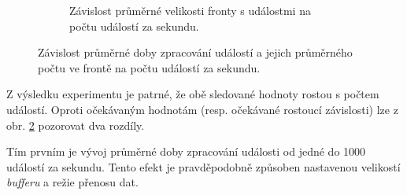 \begin{figure}[h]
\begin{subfigure}[t!]{0.47\textwidth}
        \caption{Závislost průměrné velikosti fronty s událostmi na počtu událostí za sekundu.}
        \label{fig:test:exp1:zavyslost_na_poctu_udalosti:velikost_fronty}
        
    \end{subfigure}
        
    \caption{Závislost průměrné doby zpracování událostí a jejich průměrného počtu ve frontě na počtu událostí za sekundu.}
    \label{fig:test:exp1:zavyslost_na_poctu_udalosti}
\end{figure}

Z výsledku experimentu je patrné, že obě sledované hodnoty rostou s počtem událostí. Oproti očekávaným hodnotám (resp. očekávané rostoucí závislosti) lze z obr. \ref{fig:test:exp1:zavyslost_na_poctu_udalosti} pozorovat dva rozdíly. 

Tím prvním je vývoj průměrné doby zpracování události od jedné do 1000 událostí za sekundu. Tento efekt je pravděpodobně způsoben nastavenou velikostí \textit{bufferu} a režie přenosu dat.

